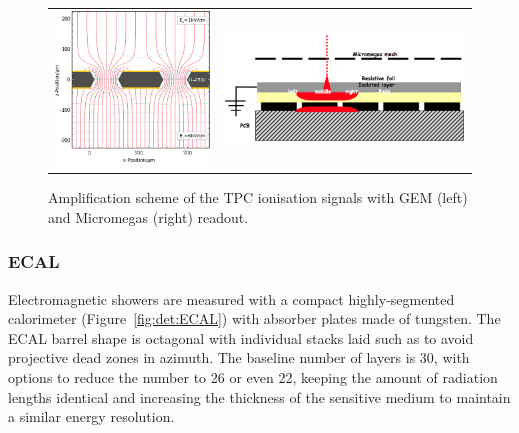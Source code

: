 \begin{figure}[t!]
\begin{tabular}{cc}
\includegraphics[width=0.5\hsize,viewport={0 -10 600 500},clip]{Detector/fig/GEM.png} &
\includegraphics[width=0.4\hsize]{Detector/fig/micromegas.png}
\end{tabular}
\caption[TPC readout]{Amplification scheme of the TPC ionisation signals with GEM (left) and Micromegas (right) readout.}
\label{fig:det:TPC_readout}
\end{figure}

\vspace{1cm}
\subsubsection*{\bf ECAL}

Electromagnetic showers are measured with a compact highly-segmented calorimeter (Figure~\ref{fig:det:ECAL}) with absorber plates made of tungsten. The ECAL barrel shape is octagonal with individual stacks laid such as to avoid projective dead zones in azimuth. The baseline number of layers is 30, with options to reduce the number to 26 or even 22, keeping the amount of radiation lengths identical and increasing the thickness of the sensitive medium to maintain a similar energy resolution. 

